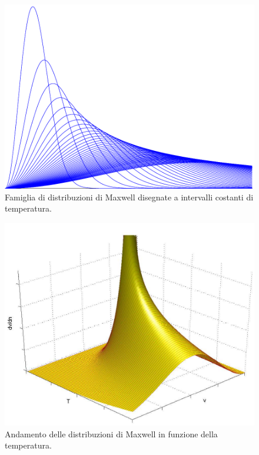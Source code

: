\begin{figure}[htbp]
\centering
\includegraphics[scale=0.7]{immagini/fisica1/maxwell_famiglia2}
\caption{Famiglia di distribuzioni di Maxwell disegnate a intervalli costanti di temperatura.}
\end{figure}

\begin{figure}[htbp]
\centering
\includegraphics[scale=0.8]{immagini/fisica1/maxwell3d}
\caption{Andamento delle distribuzioni di Maxwell in funzione della temperatura.}
\end{figure}

